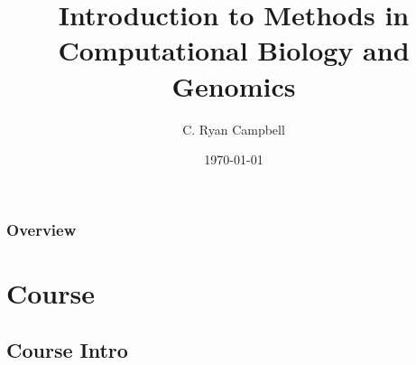 \documentclass[14pt]{beamer}
\title[Course Intro]{Introduction to Methods in Computational Biology and Genomics} %
\author{C. Ryan Campbell} %
\institute[Duke] %
{
Duke University \\ %
\medskip
\textit{c.ryan.campbell@duke.edu} %
}
\date{\today} %
\begin{document}
\begin{frame}
\titlepage %
\end{frame}

\begin{frame}
\frametitle{Overview} %
\tableofcontents %
\end{frame}


\section{Course} %

\subsection{Course Intro} %
\end{document}
